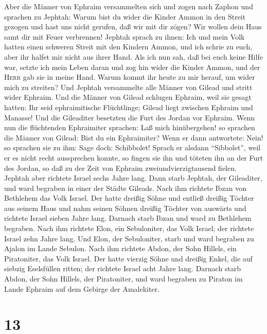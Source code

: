  Aber die Männer von Ephraim versammelten sich und zogen
nach Zaphon und sprachen zu Jephtah: Warum bist du wider die Kinder
Ammon in den Streit gezogen und hast uns nicht gerufen, daß wir mit dir
zögen? Wir wollen dein Haus samt dir mit Feuer verbrennen!
 Jephtah sprach zu ihnen: Ich und mein Volk hatten einen
schweren Streit mit den Kindern Ammon, und ich schrie zu euch, aber ihr
halfet mir nicht aus ihrer Hand.  Als ich nun sah, daß bei
euch keine Hilfe war, setzte ich mein Leben daran und zog hin wider die
Kinder Ammon, und der \textsc{Herr} gab sie in meine Hand. Warum kommt
ihr heute zu mir herauf, um wider mich zu streiten?  Und
Jephtah versammelte alle Männer von Gilead und stritt wider Ephraim. Und
die Männer von Gilead schlugen Ephraim, weil sie gesagt hatten: Ihr seid
ephraimitische Flüchtlinge; Gilead liegt zwischen Ephraim und Manasse!
 Und die Gileaditer besetzten die Furt des Jordan vor
Ephraim. Wenn nun die flüchtenden Ephraimiter sprachen: Laß mich
hinübergehen! so sprachen die Männer von Gilead: Bist du ein
Ephraimiter? Wenn er dann antwortete: Nein!  so sprachen
sie zu ihm: Sage doch: Schibbolet! Sprach er alsdann ``Sibbolet'', weil
er es nicht recht aussprechen konnte, so fingen sie ihn und töteten ihn
an der Furt des Jordan, so daß zu der Zeit von Ephraim
zweiundvierzigtausend fielen.  Jephtah aber richtete
Israel sechs Jahre lang. Dann starb Jephtah, der Gileaditer, und ward
begraben in einer der Städte Gileads.  Nach ihm richtete
Ibzan von Bethlehem das Volk Israel.  Der hatte dreißig
Söhne und entließ dreißig Töchter aus seinem Haus und nahm seinen Söhnen
dreißig Töchter von auswärts und richtete Israel sieben Jahre lang.
 Darnach starb Ibzan und ward zu Bethlehem begraben.
 Nach ihm richtete Elon, ein Sebuloniter, das Volk
Israel; der richtete Israel zehn Jahre lang.  Und Elon,
der Sebuloniter, starb und ward begraben zu Ajalon im Lande Sebulon.
 Nach ihm richtete Abdon, der Sohn Hillels, ein
Piratoniter, das Volk Israel.  Der hatte vierzig Söhne
und dreißig Enkel, die auf siebzig Eselsfüllen ritten; der richtete
Israel acht Jahre lang.  Darnach starb Abdon, der Sohn
Hillels, der Piratoniter, und ward begraben zu Piraton im Lande Ephraim
auf dem Gebirge der Amalekiter.

\hypertarget{section-12}{%
\section{13}\label{section-12}}

